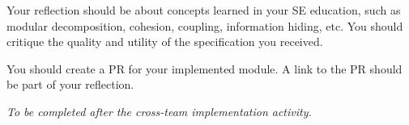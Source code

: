 \documentclass[12pt, titlepage]{article}
\begin{document}
\begin{enumerate}
  Your reflection should be about concepts learned in your SE education, such
  as modular decomposition, cohesion, coupling, information hiding, etc.  You
  should critique the quality and utility of the specification you received.

  You should create a PR for your implemented module.  A link to the PR should
  be part of your reflection.

  \emph{To be completed after the cross-team implementation activity.}

\end{enumerate}
\end{document}
